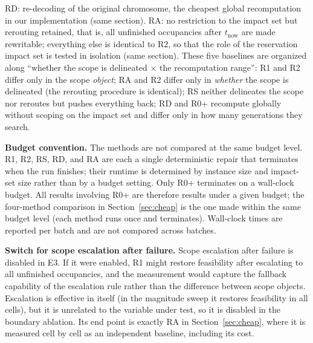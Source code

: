 RD: re-decoding of the original chromosome, the cheapest global recomputation in our implementation (same section).
RA: no restriction to the impact set but rerouting retained, that is, all unfinished occupancies after \(t_{\mathrm{now}}\) are made rewritable; everything else is identical to R2,
so that the role of the reservation impact set is tested in isolation (same section).
These five baselines are organized along ``whether the scope is delineated \(\times\) the recomputation range'': R1 and R2 differ only in the scope \emph{object};
RA and R2 differ only in \emph{whether} the scope is delineated (the rerouting procedure is identical); RS neither delineates the scope nor reroutes but pushes everything back;
RD and R0+ recompute globally without scoping on the impact set and differ only in how many generations they search.

\textbf{Budget convention.}
The methods are not compared at the same budget level. R1, R2, RS, RD, and RA are each a single deterministic repair
that terminates when the run finishes; their runtime is determined by instance size and impact-set size rather than by a budget setting. Only R0+ terminates on a wall-clock budget.
All results involving R0+ are therefore results under a given budget; the four-method comparison in Section~\ref{sec:cheap} is the one made within the same budget level
(each method runs once and terminates). Wall-clock times are reported per batch and are not compared across batches.

\textbf{Switch for scope escalation after failure.}
Scope escalation after failure is disabled in E3. If it were enabled, R1 might restore feasibility after escalating to all unfinished occupancies,
and the measurement would capture the fallback capability of the escalation rule rather than the difference between scope objects. Escalation is effective in itself (in the magnitude sweep it restores feasibility in all
cells), but it is unrelated to the variable under test, so it is disabled in the boundary ablation.
Its end point is exactly RA in Section~\ref{sec:cheap}, where it is measured cell by cell as an independent baseline, including its cost.

